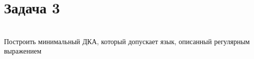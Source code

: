 \documentclass[a4paper]{article}
\begin{document}
\section{Задача 3}
\\ Построить минимальный ДКА, который допускает язык, описанный регулярным выражением
\end{document}
